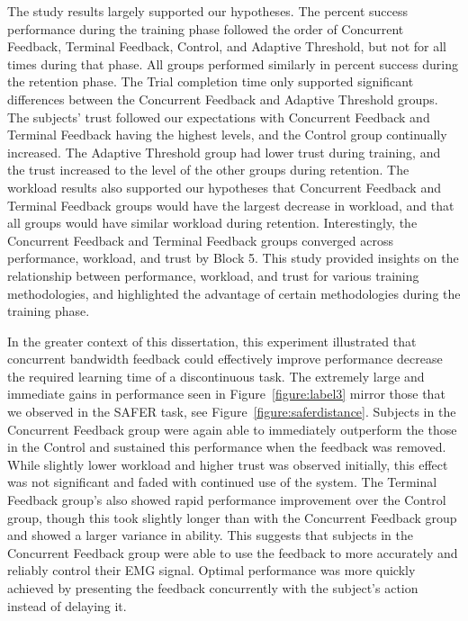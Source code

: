 The study results largely supported our hypotheses.
The percent success performance during the training phase followed the order of Concurrent Feedback, Terminal Feedback, Control, and Adaptive Threshold, but not for all times during that phase.
All groups performed similarly in percent success during the retention phase.
The Trial completion time only supported significant differences between the Concurrent Feedback and Adaptive Threshold groups.
The subjects' trust followed our expectations with Concurrent Feedback and Terminal Feedback having the highest levels, and the Control group continually increased.
The Adaptive Threshold group had lower trust during training, and the trust increased to the level of the other groups during retention.
The workload results also supported our hypotheses that Concurrent Feedback and Terminal Feedback groups would have the largest decrease in workload, and that all groups would have similar workload during retention.
Interestingly, the Concurrent Feedback and Terminal Feedback groups converged across performance, workload, and trust by Block 5.
This study provided insights on the relationship between performance, workload, and trust for various training methodologies, and highlighted the advantage of certain methodologies during the training phase.


In the greater context of this dissertation, this experiment illustrated that concurrent bandwidth feedback could effectively improve performance decrease the required learning time of a discontinuous task.
The extremely large and immediate gains in performance seen in Figure~\ref{figure:label3} mirror those that we observed in the SAFER task, see Figure~\ref{figure:saferdistance}.
Subjects in the Concurrent Feedback group were again able to immediately outperform the those in the Control and sustained this performance when the feedback was removed.
While slightly lower workload and higher trust was observed initially, this effect was not significant and faded with continued use of the system.
The Terminal Feedback group's also showed rapid performance improvement over the Control group, though this took slightly longer than with the Concurrent Feedback group and showed a larger variance in ability.
This suggests that subjects in the Concurrent Feedback group were able to use the feedback to more accurately and reliably control their EMG signal.
Optimal performance was more quickly achieved by presenting the feedback concurrently with the subject's action instead of delaying it.
